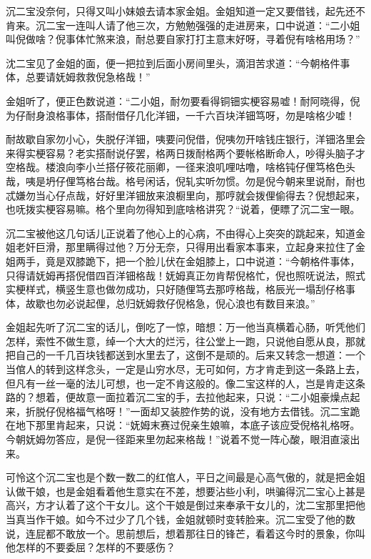 \documentclass[12pt,UTF8]{ctexbook}
\begin{document}
{{{沉二宝没奈何，只得又叫小妹娘去请本家金姐。金姐知道一定又要借钱，起先还不肯来。沉二宝一连叫人请了他三次，方勉勉强强的走进房来，口中说道：“二小姐叫倪做啥？倪事体忙煞来浪，耐总要自家打打主意末好呀，寻着倪有啥格用场？”

沈二宝见了金姐的面，便一把拉到后面小房间里头，滴泪苦求道：“今朝格件事体，总要请妩姆救救倪急格哉！”

金姐听了，便正色数说道：“二小姐，耐勿要看得铜钿实梗容易嘘！耐阿晓得，倪为仔耐身浪格事体，搭耐借仔几化洋钿，一千六百块洋钿笃呀，勿是啥格少嘘！

耐故歇自家勿小心，失脱仔洋钿，咦要问倪借，倪咦勿开啥钱庄银行，洋钿洛里会来得实梗容易？老实搭耐说仔罢，格两日拨耐格两个要帐格断命人，吵得头脑子才空格哉。楼浪向李小兰搭仔筱花丽卿，一径来浪叽哩咕噜，啥格钝仔俚笃格色头哉，咦是坍仔俚笃格台哉。格号闲话，倪轧实听勿惯。勿是倪今朝来里说耐，耐也忒嫌勿当心仔点哉，好好里洋钿放来浪橱里向，那哼就会拨俚偷得去？倪想起来，也呒拨实梗容易嘛。格个里向勿得知到底啥格讲究？“说着，便瞟了沉二宝一眼。

沉二宝被他这几句话儿正说着了他心上的心病，不由得心上突突的跳起来，知道金姐老奸巨滑，那里瞒得过他？万分无奈，只得用出看家本事来，立起身来拉住了金姐两手，竟是双膝跪下，把一个脸儿伏在金姐膝上，口中说道：“今朝格件事体，只得请妩姆再搭倪借四百洋钿格哉！妩姆真正勿肯帮倪格忙，倪也照呒说法，照式实梗样式，横竖生意也做勿成功，只好随俚笃去那哼格哉，格辰光一塌刮仔格事体，故歇也勿必说起俚，总归妩姆救仔倪格急，倪心浪也有数目来浪。”

金姐起先听了沉二宝的话儿，倒吃了一惊，暗想：万一他当真横着心肠，听凭他们怎样，索性不做生意，绰一个大大的烂污，往公堂上一跑，只说他自愿从良，那就把自己的一千几百块钱都送到水里去了，这倒不是顽的。后来又转念一想道：一个当倌人的转到这样念头，一定是山穷水尽，无可如何，方才肯走到这一条路上去，但凡有一丝一毫的法儿可想，也一定不肯这般的。像二宝这样的人，岂是肯走这条路的？想着，便故意一面拉着沉二宝的手，去拉他起来，只说：“二小姐豪燥点起来，折脱仔倪格福气格呀！”一面却又装腔作势的说，没有地方去借钱。沉二宝跪在地下那里肯起来，只说：“妩姆末赛过倪亲生娘嘛，本底子该应受倪格礼格呀。今朝妩姆勿答应，是倪一径距来里勿起来格哉！”说着不觉一阵心酸，眼泪直滚出来。

可怜这个沉二宝也是个数一数二的红倌人，平日之间最是心高气傲的，就是把金姐认做干娘，也是金姐看着他生意实在不差，想要沾些小利，哄骗得沉二宝心上甚是高兴，方才认着了这个干女儿。这个干娘是倒过来奉承干女儿的，沈二宝那里把他当真当作干娘。如今不过少了几个钱，金姐就顿时变转脸来。沉二宝受了他的数说，连屁都不敢放一个。思前想后，想着那往日的锋芒，看着这今时的景象，你叫他怎样的不要委屈？怎样的不要感伤？

}}}
\end{document}
